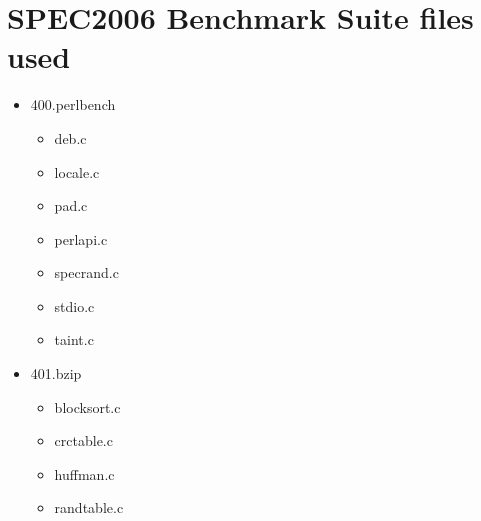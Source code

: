 
\clearpage
\section{SPEC2006 Benchmark Suite files used}
\label{app:SPEC2006_files_used}

\begin{multicols}{3}
\begin{itemize}
	\item 400.perlbench
	\begin{itemize}
		\item deb.c
		\item locale.c
		\item pad.c
		\item perlapi.c
		\item specrand.c
		\item stdio.c
		\item taint.c
	\end{itemize}

	\item 401.bzip
	\begin{itemize}
		\item blocksort.c
		\item crctable.c
		\item huffman.c
		\item randtable.c
	\end{itemize}


\end{itemize}
\end{multicols}
